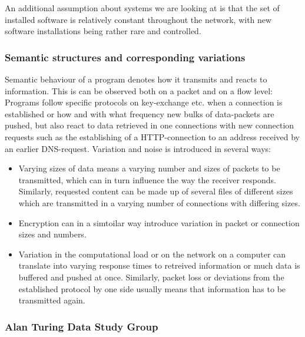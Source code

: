 \documentclass[a4paper,12pt,twoside]{report}
\begin{document}
An additional assumption about systems we are looking at is that the set of installed software is relatively constant throughout the network, with new software installations being rather rare and controlled. 

\subsubsection{Semantic structures and corresponding variations}

Semantic behaviour of a program denotes how it transmits and reacts to information. This is can be observed both on a packet and on a flow level: Programs follow specific protocols on key-exchange etc. when a connection is established or how and with what frequency new bulks of data-packets are pushed, but also react to data retrieved in one connections with new connection requests such as the establishing of a HTTP-connection to an address received by an earlier DNS-request. Variation and noise is introduced in several ways:

\begin{itemize}

\item Varying sizes of data means a varying number and sizes of packets to be transmitted, which can in turn influence the way the receiver responds. Similarly, requested content can be made up of several files of different sizes which are transmitted in a varying number of connections with differing sizes.
\item Encryption can in a simtoilar way introduce variation in packet or connection sizes and numbers.
\item Variation in the computational load or on the network on a computer can translate into varying response times to retreived information or much data is buffered and pushed at once. Similarly, packet loss or deviations from the established protocol by one side usually means that information has to be transmitted again.

\end{itemize}



\subsubsection{Alan Turing Data Study Group}
\end{document}
